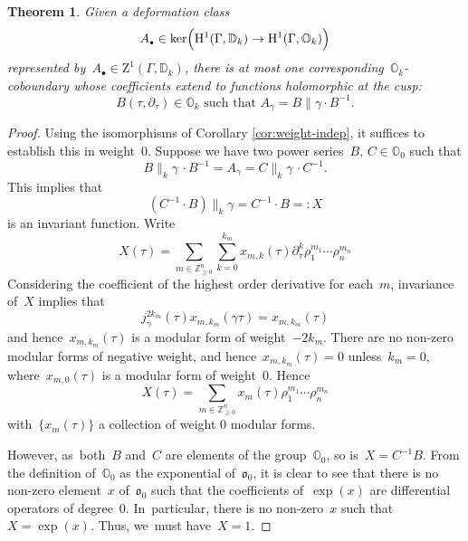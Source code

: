 \documentclass[JEP,XML,SOM,Unicode,published]{cedram}
\let\oldbullet\bullet
\renewcommand{\bullet}{{\scriptscriptstyle\oldbullet}}
\theoremstyle{plain}
\newtheorem{theorem}[theoremcounter]{Theorem}
\theoremstyle{definition}
\newcommand{\tx}{\text}
\newcommand{\nbd}{\nobreakdash-\hspace{0pt}}
\newcommand{\bbD}{\ensuremath{\mathbb{D}}}
\newcommand{\bbO}{\ensuremath{\mathbb{O}}}
\newcommand{\bbZ}{\ensuremath{\mathbb{Z}}}
\newcommand{\frako}{\ensuremath{\mathfrak{o}}}
\newcommand{\rmH}{\ensuremath{\mathrm{H}}}
\newcommand{\rmZ}{\ensuremath{\mathrm{Z}}}
\let\Ga\Gamma
\let\ga\gamma
\begin{document}
\begin{theorem}
\label{thm:uniqueness_of_coboundary}
Given a deformation class
\begin{equation*}
A_\bullet
\in
\ker\Bigl(
\rmH^1(\Ga,\bbD_k)
\to
\rmH^1(\Ga,\bbO_k)
\Bigr)
\end{equation*}
represented by~$A_\bullet \in \rmZ^1(\Ga, \bbD_k)$, there is at most one corresponding~$\bbO_k$\nbd{}coboundary whose coefficients extend to functions holomorphic at the cusp:
\begin{equation*}
B(\tau,\partial_\tau) \in \bbO_k
\tx{\ such that }
A_\ga
=
B \big\| \ga \cdot B^{-1}
\tx{.}
\end{equation*}

\end{theorem}

\begin{proof}
Using the isomorphisms of Corollary \ref{cor:weight-indep}, it suffices to establish this in weight~$0$. Suppose we have two power series~$B,\,C\in\bbO_0$ such that
\begin{equation*}B\big\|_k\ga\,\cdot B^{-1}= A_\ga = C\big\|_k\ga\,\cdot C^{-1}.\end{equation*}
This implies that
\begin{equation*} (C^{-1}\cdot B)\big\|_k\ga = C^{-1}\cdot B =: X\end{equation*}
is an invariant function. Write
\begin{equation*}X(\tau) = \sum_{m\in \bbZ_{\geq 0}^n}\sum_{k=0}^{k_m} x_{m,k}(\tau)\partial_\tau^k \rho_1^{m_1}\cdots \rho_n^{m_n}\end{equation*}
Considering the coefficient of the highest order derivative for each~$m$, invariance of~$X$ implies that
\begin{equation*}j_\ga^{2k_m}(\tau)x_{m,k_m}(\ga\tau)=x_{m,k_m}(\tau)\end{equation*}
and hence~$x_{m,k_m}(\tau)$ is a modular form of weight~$-2k_m$. There are no non-zero modular forms of negative weight, and hence~$x_{m,k_m}(\tau)=0$ unless~$k_m=0$, where~$x_{m,0}(\tau)$ is a modular form of weight~$0$. Hence
\begin{equation*}X(\tau) =\sum_{m\in \bbZ_{\geq 0}^n}x_{m}(\tau)\rho_1^{m_1}\cdots \rho_n^{m_n}\end{equation*}
with~$\{x_{m}(\tau)\}$ a collection of weight 0 modular forms.

However, as~both~$B$ and~$C$ are elements of the group~$\bbO_0$, so is~$X=C^{-1}B$. From the definition of~$\bbO_0$ as the exponential of~$\frako_0$, it is clear to see that there is no non-zero element~$x$ of~$\frako_0$ such that the coefficients of~$\exp(x)$ are differential operators of degree~$0$. In~particular, there is no non-zero~$x$ such that~$X=\exp(x)$. Thus, we~must have~$X=1$.
\end{proof}
\end{document}
